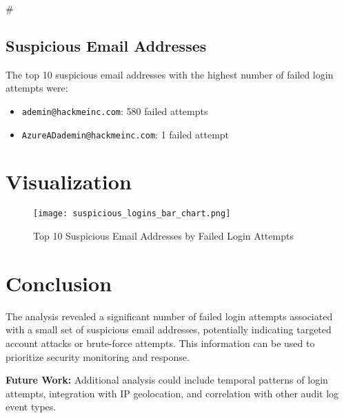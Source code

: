 #\documentclass{article}
\begin{document}
\subsection*{Suspicious Email Addresses}

The top 10 suspicious email addresses with the highest number of failed login attempts were:

\begin{itemize}
    \item \texttt{ademin@hackmeinc.com}: 580 failed attempts
    \item \texttt{AzureADademin@hackmeinc.com}: 1 failed attempt
\end{itemize}

\section*{Visualization}

\begin{figure}[h]
    \centering
    \texttt{[image: suspicious\_logins\_bar\_chart.png]}
    \caption{Top 10 Suspicious Email Addresses by Failed Login Attempts}
    \label{fig:bar_chart}
\end{figure}

\section*{Conclusion}

The analysis revealed a significant number of failed login attempts associated with a small set of suspicious email addresses, potentially indicating targeted account attacks or brute-force attempts. This information can be used to prioritize security monitoring and response.

\bigskip

\noindent\textbf{Future Work:} Additional analysis could include temporal patterns of login attempts, integration with IP geolocation, and correlation with other audit log event types.
\end{document}
